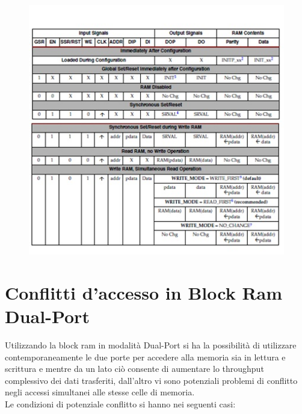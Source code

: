 \begin{figure}[!h]
\centering
\includegraphics[width=\textwidth]{img/blockRam/operazioni.jpg}
\label{fig:set_ass}
\end{figure}

\section{Conflitti d'accesso in Block Ram Dual-Port}
Utilizzando la block ram in modalit\`a Dual-Port  si ha la possibilit\`a di utilizzare contemporaneamente le due porte per accedere alla memoria sia in lettura e scrittura e mentre da un lato ci\`o consente di aumentare lo throughput complessivo dei dati trasferiti, dall'altro vi sono potenziali problemi di conflitto negli accessi simultanei alle stesse celle di memoria.
\\
Le condizioni di potenziale conflitto si hanno nei seguenti casi:

